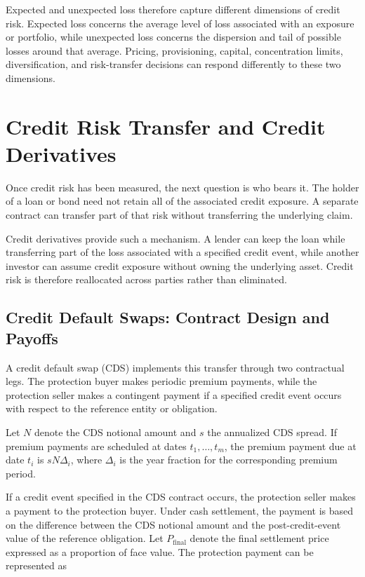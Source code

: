Expected and unexpected loss therefore capture different dimensions of credit risk. Expected loss concerns the average level of loss associated with an exposure or portfolio, while unexpected loss concerns the dispersion and tail of possible losses around that average. Pricing, provisioning, capital, concentration limits, diversification, and risk-transfer decisions can respond differently to these two dimensions.


\section[Credit Risk Transfer and Credit Derivatives]{Credit Risk Transfer and Credit \\Derivatives}

Once credit risk has been measured, the next question is who bears it. The holder of a loan or bond need not retain all of the associated credit exposure. A separate contract can transfer part of that risk without transferring the underlying claim.

Credit derivatives provide such a mechanism. A lender can keep the loan while transferring part of the loss associated with a specified credit event, while another investor can assume credit exposure without owning the underlying asset. Credit risk is therefore reallocated across parties rather than eliminated.


\subsection[Credit Default Swaps: Contract Design and Payoffs]{Credit Default Swaps: Contract Design and \\Payoffs}

A credit default swap (CDS) implements this transfer through two contractual legs. The protection buyer makes periodic premium payments, while the protection seller makes a contingent payment if a specified credit event occurs with respect to the reference entity or obligation.

Let \(N\) denote the CDS notional amount and \(s\) the annualized CDS spread. If premium payments are scheduled at dates \(t_1,\ldots,t_m\), the premium payment due at date \(t_i\) is \(sN\Delta_i\), where \(\Delta_i\) is the year fraction for the corresponding premium period.

If a credit event specified in the CDS contract occurs, the protection seller makes a payment to the protection buyer. Under cash settlement, the payment is based on the difference between the CDS notional amount and the post-credit-event value of the reference obligation. Let \(P_{\mathrm{final}}\) denote the final settlement price expressed as a proportion of face value. The protection payment can be represented as

